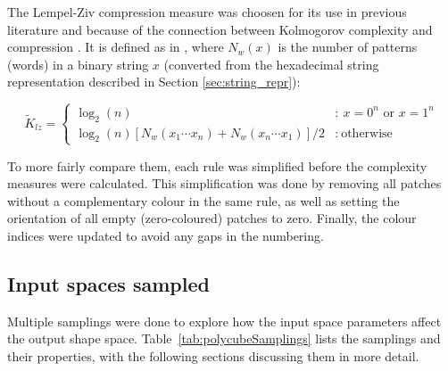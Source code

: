 The Lempel-Ziv compression measure was choosen for its use in previous literature \cite{johnston2021, dingle2018input} and because of the connection between Kolmogorov complexity and compression \cite{johnston2021}. It is defined as in \cite{dingle2018input}, where \(N_w(x)\) is the number of patterns (words) in a binary string \(x\) (converted from the hexadecimal string representation described in Section \ref{sec:string_repr}):

\[
    \widetilde{K}_{lz} = \left\{ \begin{array}{cl}
        \log_2\left( n \right) & : \ x = 0^n \text{ or } x = 1^n \\
        \log_2\left( n \right)\left[ N_w\left( x_1\cdots x_n \right) + N_w\left( x_n\cdots x_1 \right) \right] / 2 & : \ \text{otherwise}
        \end{array} \right.
\]

To more fairly compare them, each rule was simplified before the complexity measures were calculated. This simplification was done by removing all patches without a complementary colour in the same rule, as well as setting the orientation of all empty (zero-coloured) patches to zero. Finally, the colour indices were updated to avoid any gaps in the numbering.

\subsection{Input spaces sampled}

Multiple samplings were done to explore how the input space parameters affect the output shape space. Table~\ref{tab:polycubeSamplings} lists the samplings and their properties, with the following sections discussing them in more detail.




